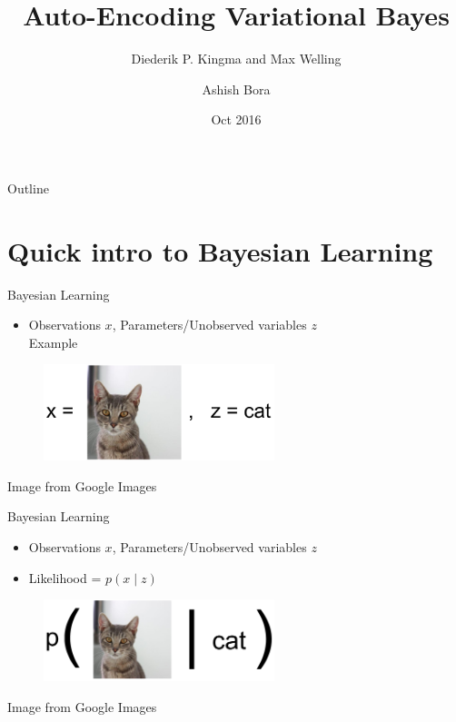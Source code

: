 \documentclass{beamer}
\title{Auto-Encoding Variational Bayes}
\subtitle{Diederik P. Kingma and Max Welling}
\author{Ashish Bora}
\date{Oct 2016}
\begin{document}
\begin{frame}
  \titlepage
\end{frame}

\begin{frame}{Outline}
  \tableofcontents
\end{frame}

\section{Quick intro to Bayesian Learning}



\begin{frame}{Bayesian Learning}{}
    \begin{itemize}
        \item Observations $x$, Parameters/Unobserved variables $z$ \\
        Example
    \end{itemize}

    \begin{figure}
        \centering
        \includegraphics[width=0.6\textwidth]{bayes1}
    \end{figure}
    {\small Image from Google Images}
\end{frame}

\begin{frame}{Bayesian Learning}{}
    \begin{itemize}
        \item Observations $x$, Parameters/Unobserved variables $z$
        \item Likelihood = $p ( x \mid z )$
    \end{itemize}

    \begin{figure}
        \centering
        \includegraphics[width=0.6\textwidth]{bayes2}
    \end{figure}
    {\small Image from Google Images}
\end{frame}
\end{document}
